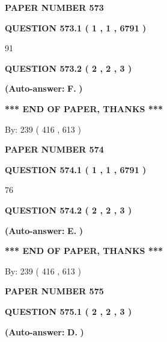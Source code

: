 \documentclass[12pt]{article}
\begin{document}
   
\newpage 
\setcounter{page}{ 
   573001 } 
   
   
 {\textbf{ \Large{ PAPER NUMBER  573  }}}
   
   
   
   
  
  
{\textbf{\large{QUESTION
573.1 
 ( 1 , 1 , 6791 )
}}}

91
  
  
{\textbf{\large{QUESTION
573.2 
 ( 2 , 2 , 3 )
}}}
 
 
{\textbf{(Auto-answer:}}
{\textbf{\large{
F.}}}
{\textbf{)}}
 
 
   
   
   
   
\vspace{1.0in} 
{\textbf{\large{ *** END OF PAPER, THANKS *** }}} 
   
   
\hspace{1.0in} By: 
 239 ( 416 ,  613 )
   
   
   
   
\newpage 
\setcounter{page}{ 
   574001 } 
   
   
 {\textbf{ \Large{ PAPER NUMBER  574  }}}
   
   
   
   
  
  
{\textbf{\large{QUESTION
574.1 
 ( 1 , 1 , 6791 )
}}}

76
  
  
{\textbf{\large{QUESTION
574.2 
 ( 2 , 2 , 3 )
}}}
 
 
{\textbf{(Auto-answer:}}
{\textbf{\large{
E.}}}
{\textbf{)}}
 
 
   
   
   
   
\vspace{1.0in} 
{\textbf{\large{ *** END OF PAPER, THANKS *** }}} 
   
   
\hspace{1.0in} By: 
 239 ( 416 ,  613 )
   
   
   
   
\newpage 
\setcounter{page}{ 
   575001 } 
   
   
 {\textbf{ \Large{ PAPER NUMBER  575  }}}
   
   
   
   
  
  
{\textbf{\large{QUESTION
575.1 
 ( 2 , 2 , 3 )
}}}
 
 
{\textbf{(Auto-answer:}}
{\textbf{\large{
D.}}}
{\textbf{)}}
 
 
  
\end{document}
